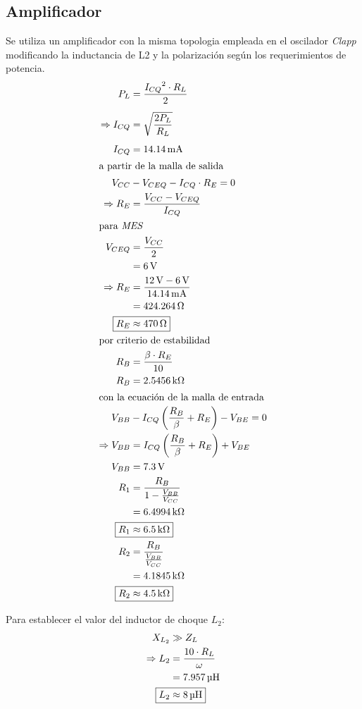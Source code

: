 \documentclass[journal]{IEEEtran}
\begin{document}
\subsection{Amplificador}
Se utiliza un amplificador con la misma topologia empleada en el oscilador  \emph{Clapp} modificando la inductancia de L2 y la polarización según los requerimientos de potencia.
\begin{align*}
    P_L &= \frac{{I_{CQ}}^2 \cdot R_L}{2}\\[1ex]
    \Rightarrow I_{CQ} &= \sqrt{\frac{2 P_L}{R_L}}\\[1ex]
    I_{CQ} &= \SI{14.14}{\milli\ampere}\\
    \intertext{a partir de la malla de salida}
    V_{CC} &- V_{CEQ}-I_{CQ}\cdot R_E = 0\\
    \Rightarrow R_E &= \frac{V_{CC}-V_{CEQ}}{I_{CQ}}\\
    \intertext{para \emph{MES}}
    V_{CEQ} &= \frac{V_{CC}}{2}\\
    &= \SI{6}{\volt}\\
    \Rightarrow R_E &= \frac{\SI{12}{\volt} -\SI{6}{\volt}}{\SI{14.14}{\milli\ampere}}\\
    &= \SI{424.264}{\ohm}\\
    \Aboxed{R_E &\approx \SI{470}{\ohm}}\\
    \intertext{por criterio de estabilidad}
    R_B &= \frac{\beta \cdot R_E}{10}\\
    R_B &= \SI{2.5456}{\kilo\ohm}\\
    \intertext{con la ecuación de la malla de entrada}
    V_{BB} &- I_{CQ}\left( \frac{R_B}{\beta}+R_E \right) - V_{BE} = 0\\
    \Rightarrow V_{BB} &= I_{CQ}\left( \frac{R_B}{\beta}+R_E \right) + V_{BE}\\
    V_{BB} &= \SI{7.3}{\volt}\\
    R_1 &= \frac{R_B}{1-\frac{V_{BB}}{V_{CC}}}\\
    &= \SI{6.4994}{\kilo\ohm}\\
    \Aboxed{R_1 &\approx \SI{6.5}{\kilo\ohm}}\\
    R_2 &= \frac{R_B}{\frac{V_{BB}}{V_{CC}}}\\
    &= \SI{4.1845}{\kilo\ohm}\\
    \Aboxed{R_2 &\approx \SI{4.5}{\kilo\ohm}}
\end{align*}

Para establecer el valor del inductor de choque $L_2$:
\begin{align*}
    X_{L_2} &\gg Z_L\\
    \Rightarrow L_2 &= \frac{10\cdot R_L}{\omega}\\
    &= \SI{7.957}{\micro\henry}\\
    \Aboxed{L_2 &\approx \SI{8}{\micro\henry}}
\end{align*}
\end{document}
